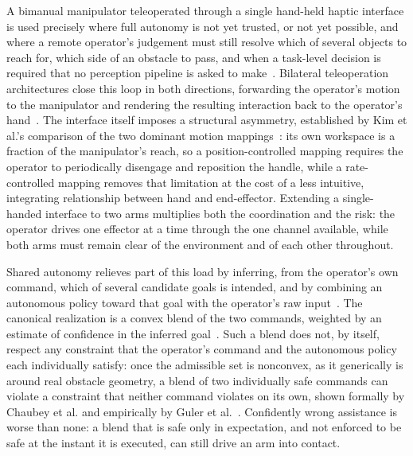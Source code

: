 \documentclass[12pt,a4paper,twoside,openright]{report}
\begin{document}
A bimanual manipulator teleoperated through a single hand-held haptic interface is used precisely where full autonomy is not yet trusted, or not yet possible, and where a remote operator's judgement must still resolve which of several objects to reach for, which side of an obstacle to pass, and when a task-level decision is required that no perception pipeline is asked to make~\cite{jain2020probabilistic}. Bilateral teleoperation architectures close this loop in both directions, forwarding the operator's motion to the manipulator and rendering the resulting interaction back to the operator's hand~\cite{hokayem2006bilateral}. The interface itself imposes a structural asymmetry, established by Kim et al.'s comparison of the two dominant motion mappings~\cite{kim1987comparison}: its own workspace is a fraction of the manipulator's reach, so a position-controlled mapping requires the operator to periodically disengage and reposition the handle, while a rate-controlled mapping removes that limitation at the cost of a less intuitive, integrating relationship between hand and end-effector. Extending a single-handed interface to two arms multiplies both the coordination and the risk: the operator drives one effector at a time through the one channel available, while both arms must remain clear of the environment and of each other throughout.

Shared autonomy relieves part of this load by inferring, from the operator's own command, which of several candidate goals is intended, and by combining an autonomous policy toward that goal with the operator's raw input~\cite{selvaggio2021autonomy,losey2018review}. The canonical realization is a convex blend of the two commands, weighted by an estimate of confidence in the inferred goal~\cite{dragan2013policy}. Such a blend does not, by itself, respect any constraint that the operator's command and the autonomous policy each individually satisfy: once the admissible set is nonconvex, as it generically is around real obstacle geometry, a blend of two individually safe commands can violate a constraint that neither command violates on its own, shown formally by Chaubey et al. and empirically by Guler et al.~\cite{chaubey2026minimalintervention,guler2026barrierik}. Confidently wrong assistance is worse than none: a blend that is safe only in expectation, and not enforced to be safe at the instant it is executed, can still drive an arm into contact.
\end{document}
